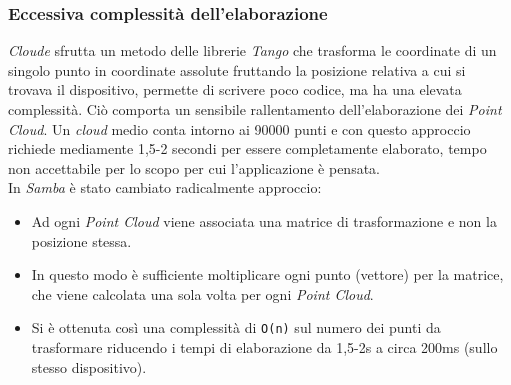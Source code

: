 \subsubsection{Eccessiva complessità dell'elaborazione}
\emph{Cloude} sfrutta un metodo delle librerie \emph{Tango} che trasforma le coordinate di un singolo punto in coordinate assolute fruttando la posizione relativa a cui si trovava il dispositivo, permette di scrivere poco codice, ma ha una elevata complessità. Ciò comporta un sensibile rallentamento dell'elaborazione dei \emph{Point Cloud}. Un \emph{cloud} medio conta intorno ai 90000 punti e con questo approccio richiede mediamente 1,5-2 secondi per essere completamente elaborato, tempo non accettabile per lo scopo per cui l'applicazione è pensata.\\
In \emph{Samba} è stato cambiato radicalmente approccio:
\begin{itemize}
	\item Ad ogni \emph{Point Cloud} viene associata una matrice di trasformazione e non la posizione stessa.
	\item In questo modo è sufficiente moltiplicare ogni punto (vettore) per la matrice, che viene calcolata una sola volta per ogni \emph{Point Cloud}. 
	\item Si è ottenuta così una complessità di \texttt{O(n)} sul numero dei punti da trasformare riducendo i tempi di elaborazione da 1,5-2s a circa 200ms (sullo stesso dispositivo).
\end{itemize}
